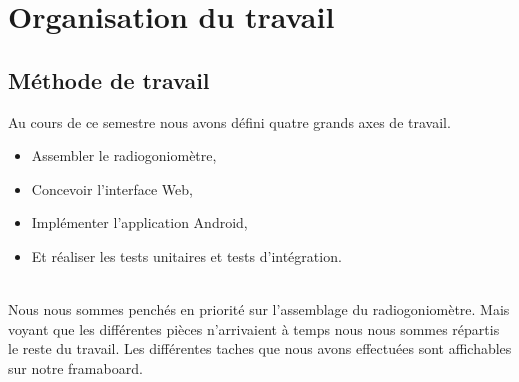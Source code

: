 
\chapter{Organisation du travail}


\section{Méthode de travail}

Au cours de ce semestre nous avons défini quatre grands axes de travail. 

\begin{itemize}
\item Assembler le radiogoniomètre,
\item Concevoir l'interface Web,
\item Implémenter l'application Android,
\item Et réaliser les tests unitaires et tests d'intégration.

\end{itemize}
~\\

Nous nous sommes penchés en priorité sur l'assemblage du radiogoniomètre. Mais voyant que les différentes pièces n'arrivaient à temps nous nous sommes répartis le reste du travail. Les différentes taches que nous avons effectuées sont affichables sur notre framaboard. 



